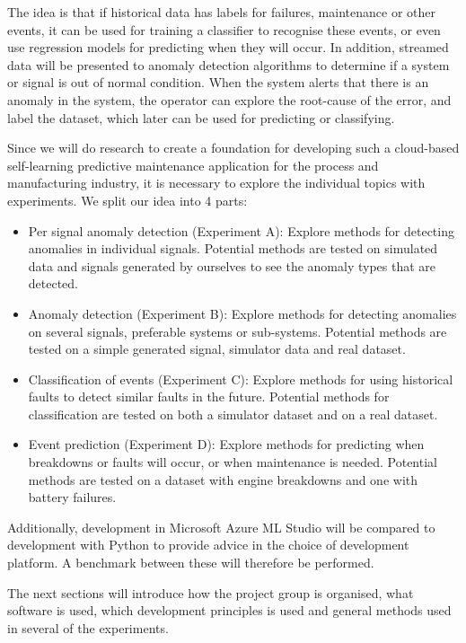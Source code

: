 \documentclass[english, a4paper]{report}
\begin{document}
{{        The idea is that if historical data has labels for failures, maintenance or other events, it can be used for training a classifier to recognise these events, or even use regression models for predicting when they will occur. In addition, streamed data will be presented to anomaly detection algorithms to determine if a system or signal is out of normal condition. When the system alerts that there is an anomaly in the system, the operator can explore the root-cause of the error, and label the dataset, which later can be used for predicting or classifying. 
        \par
        Since we will do research to create a foundation for developing such a cloud-based self-learning predictive maintenance application for the process and manufacturing industry, it is necessary to explore the individual topics with experiments. We split our idea into 4 parts:
        
        \begin{itemize}
            \item Per signal anomaly detection (Experiment A): Explore methods for detecting anomalies in individual signals. Potential methods are tested on simulated data and signals generated by ourselves to see the anomaly types that are detected. 
            \item Anomaly detection (Experiment B): Explore methods for detecting anomalies on several signals, preferable systems or sub-systems. Potential methods are tested on a simple generated signal, simulator data and real dataset.
            \item Classification of events (Experiment C): Explore methods for using historical faults to detect similar faults in the future. Potential methods for classification are tested on both a simulator dataset and on a real dataset.
            \item Event prediction (Experiment D): Explore methods for predicting when breakdowns or faults will occur, or when maintenance is needed. Potential methods are tested on a dataset with engine breakdowns and one with battery failures.
        \end{itemize}
        
        Additionally, development in Microsoft Azure ML Studio will be compared to development with Python to provide advice in the choice of development platform. A benchmark between these will therefore be performed.
        \par
        The next sections will introduce how the project group is organised, what software is used, which development principles is used and general methods used in several of the experiments.
    }
    
}
\end{document}
